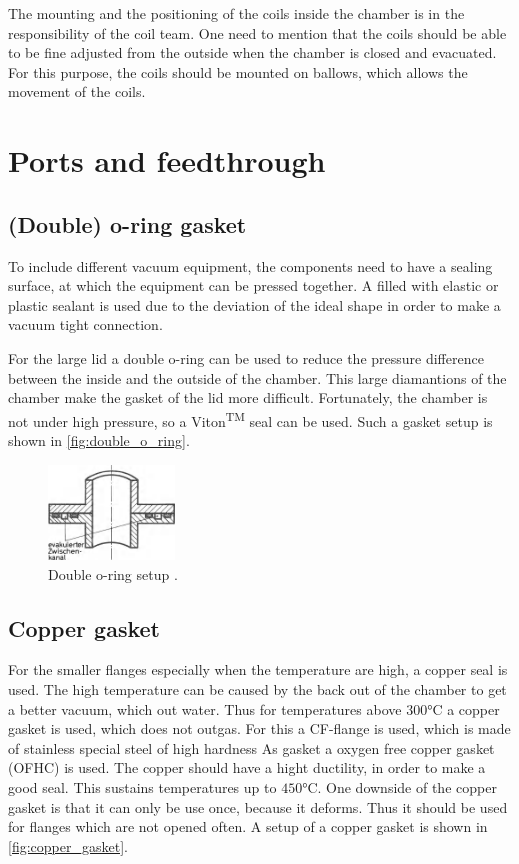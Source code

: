 The mounting and the positioning of the coils inside the chamber is in the responsibility of the coil team.
One need to mention that the coils should be able to be fine adjusted from the outside when the chamber is closed and evacuated.
For this purpose, the coils should be mounted on ballows, which allows the movement of the coils.


\section{Ports and feedthrough}

\subsection{(Double) o-ring gasket}

To include different vacuum equipment, the components need to have a sealing surface, at which the equipment can be pressed together.
A filled with elastic or plastic sealant is used due to the deviation of the ideal shape in order to make a vacuum tight connection. \cite{Wutz2000}

For the large lid a double o-ring can be used to reduce the pressure difference between the inside and the outside of the chamber.
This large diamantions of the chamber make the gasket of the lid more difficult.
Fortunately, the chamber is not under high pressure, so a Viton\textsuperscript{TM} seal can be used.
Such a gasket setup is shown in \autoref{fig:double_o_ring}.

\begin{figure}[H]
    \centering
    \includegraphics[width=0.3\textwidth]{sections/imges/seals/double_o-ring.png}
    \caption{Double o-ring setup \cite{Wutz2000}.}
    \label{fig:double_o_ring}
\end{figure}

\subsection{Copper gasket}
For the smaller flanges especially when the temperature are high, a copper seal is used.
The high temperature can be caused by the back out of the chamber to get a better vacuum, which out water.
Thus for temperatures above $300\si{\degreeCelsius}$ a copper gasket is used, which does not outgas.
For this a CF-flange is used, which is made of stainless special steel of high hardness
As gasket a oxygen free copper gasket (OFHC) is used.
The copper should have a hight ductility, in order to make a good seal.
This sustains temperatures up to $450\si{\degreeCelsius}$.
One downside of the copper gasket is that it can only be use once, because it deforms.
Thus it should be used for flanges which are not opened often.\cite{Wutz2000}
A setup of a copper gasket is shown in \autoref{fig:copper_gasket}.

